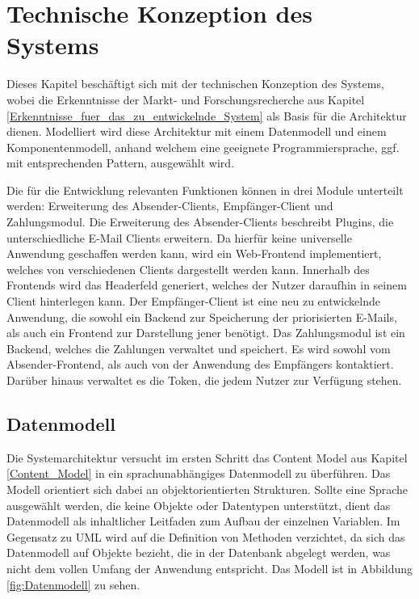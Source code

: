 
\chapter{Technische Konzeption des Systems}
\label{Technische_Konzeption_des_Systems}

Dieses Kapitel beschäftigt sich mit der technischen Konzeption des Systems, wobei die Erkenntnisse der Markt- und Forschungsrecherche aus Kapitel \ref{Erkenntnisse_fuer_das_zu_entwickelnde_System} als Basis für die Architektur dienen. Modelliert wird diese Architektur mit einem Datenmodell und einem Komponentenmodell, anhand welchem eine geeignete Programmiersprache, ggf. mit entsprechenden Pattern, ausgewählt wird.

Die für die Entwicklung relevanten Funktionen können in drei Module unterteilt werden: Erweiterung des Absender-Clients, Empfänger-Client und Zahlungsmodul. Die Erweiterung des Absender-Clients beschreibt Plugins, die unterschiedliche E-Mail Clients erweitern. Da hierfür keine universelle Anwendung geschaffen werden kann, wird ein Web-Frontend implementiert, welches von verschiedenen Clients dargestellt werden kann. Innerhalb des Frontends wird das Headerfeld generiert, welches der Nutzer daraufhin in seinem Client hinterlegen kann. Der Empfänger-Client ist eine neu zu entwickelnde Anwendung, die sowohl ein Backend zur Speicherung der priorisierten E-Mails, als auch ein Frontend zur Darstellung jener benötigt. Das Zahlungsmodul ist ein Backend, welches die Zahlungen verwaltet und speichert. Es wird sowohl vom Absender-Frontend, als auch von der Anwendung des Empfängers kontaktiert. Darüber hinaus verwaltet es die Token, die jedem Nutzer zur Verfügung stehen.

\section{Datenmodell}
\label{Datenmodell}
Die Systemarchitektur versucht im ersten Schritt das Content Model aus Kapitel \ref{Content_Model} in ein sprachunabhängiges Datenmodell zu überführen. Das Modell orientiert sich dabei an objektorientierten Strukturen. Sollte eine Sprache ausgewählt werden, die keine Objekte oder Datentypen unterstützt, dient das Datenmodell als inhaltlicher Leitfaden zum Aufbau der einzelnen Variablen. Im Gegensatz zu UML wird auf die Definition von Methoden verzichtet, da sich das Datenmodell auf Objekte bezieht, die in der Datenbank abgelegt werden, was nicht dem vollen Umfang der Anwendung entspricht. Das Modell ist in Abbildung \ref{fig:Datenmodell} zu sehen.

